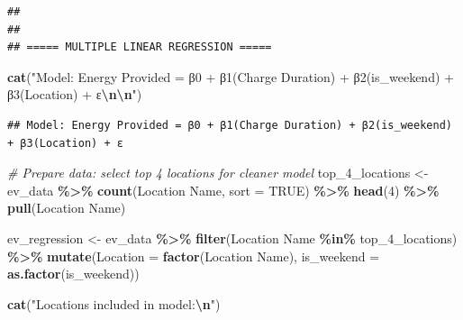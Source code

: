 \documentclass[
  12pt,
]{article}
\newenvironment{Shaded}{\begin{snugshade}}{\end{snugshade}}
\newcommand{\AttributeTok}[1]{\textcolor[rgb]{0.13,0.29,0.53}{#1}}
\newcommand{\CommentTok}[1]{\textcolor[rgb]{0.56,0.35,0.01}{\textit{#1}}}
\newcommand{\ConstantTok}[1]{\textcolor[rgb]{0.56,0.35,0.01}{#1}}
\newcommand{\DecValTok}[1]{\textcolor[rgb]{0.00,0.00,0.81}{#1}}
\newcommand{\FunctionTok}[1]{\textcolor[rgb]{0.13,0.29,0.53}{\textbf{#1}}}
\newcommand{\NormalTok}[1]{#1}
\newcommand{\OtherTok}[1]{\textcolor[rgb]{0.56,0.35,0.01}{#1}}
\newcommand{\SpecialCharTok}[1]{\textcolor[rgb]{0.81,0.36,0.00}{\textbf{#1}}}
\newcommand{\StringTok}[1]{\textcolor[rgb]{0.31,0.60,0.02}{#1}}
\begin{document}
\begin{verbatim}
## 
## 
## ===== MULTIPLE LINEAR REGRESSION =====
\end{verbatim}

\begin{Shaded}
\begin{Highlighting}[]
\FunctionTok{cat}\NormalTok{(}\StringTok{"Model: Energy Provided = β0 + β1(Charge Duration) + β2(is\_weekend) + β3(Location) + ε}\SpecialCharTok{\textbackslash{}n\textbackslash{}n}\StringTok{"}\NormalTok{)}
\end{Highlighting}
\end{Shaded}

\begin{verbatim}
## Model: Energy Provided = β0 + β1(Charge Duration) + β2(is_weekend) + β3(Location) + ε
\end{verbatim}

\begin{Shaded}
\begin{Highlighting}[]
\CommentTok{\# Prepare data: select top 4 locations for cleaner model}
\NormalTok{top\_4\_locations }\OtherTok{\textless{}{-}}\NormalTok{ ev\_data }\SpecialCharTok{\%\textgreater{}\%}
    \FunctionTok{count}\NormalTok{(}\StringTok{\textasciigrave{}}\AttributeTok{Location Name}\StringTok{\textasciigrave{}}\NormalTok{, }\AttributeTok{sort =} \ConstantTok{TRUE}\NormalTok{) }\SpecialCharTok{\%\textgreater{}\%}
    \FunctionTok{head}\NormalTok{(}\DecValTok{4}\NormalTok{) }\SpecialCharTok{\%\textgreater{}\%}
    \FunctionTok{pull}\NormalTok{(}\StringTok{\textasciigrave{}}\AttributeTok{Location Name}\StringTok{\textasciigrave{}}\NormalTok{)}

\NormalTok{ev\_regression }\OtherTok{\textless{}{-}}\NormalTok{ ev\_data }\SpecialCharTok{\%\textgreater{}\%}
    \FunctionTok{filter}\NormalTok{(}\StringTok{\textasciigrave{}}\AttributeTok{Location Name}\StringTok{\textasciigrave{}} \SpecialCharTok{\%in\%}\NormalTok{ top\_4\_locations) }\SpecialCharTok{\%\textgreater{}\%}
    \FunctionTok{mutate}\NormalTok{(}\AttributeTok{Location =} \FunctionTok{factor}\NormalTok{(}\StringTok{\textasciigrave{}}\AttributeTok{Location Name}\StringTok{\textasciigrave{}}\NormalTok{), }\AttributeTok{is\_weekend =} \FunctionTok{as.factor}\NormalTok{(is\_weekend))}

\FunctionTok{cat}\NormalTok{(}\StringTok{"Locations included in model:}\SpecialCharTok{\textbackslash{}n}\StringTok{"}\NormalTok{)}
\end{Highlighting}
\end{Shaded}
\end{document}
